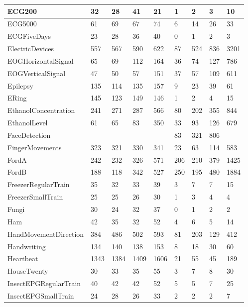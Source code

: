 \begin{landscape}
\begin{longtable}{|l|llll|llll|}
      ECG200 & 32 & 28 & 41 & 21 & 1 & 2 & 3 & 10 \\ \hline
      ECG5000 & 61 & 69 & 67 & 74 & 6 & 14 & 26 & 33 \\ \hline
      ECGFiveDays & 23 & 28 & 36 & 40 & 0 & 1 & 2 & 3 \\ \hline
      ElectricDevices & 557 & 567 & 590 & 622 & 87 & 524 & 836 & 3201 \\ \hline
      EOGHorizontalSignal & 65 & 69 & 112 & 164 & 36 & 74 & 127 & 786 \\ \hline
      EOGVerticalSignal & 47 & 50 & 57 & 151 & 37 & 57 & 109 & 611 \\ \hline
      Epilepsy & 135 & 114 & 135 & 157 & 9 & 23 & 39 & 61 \\ \hline
      ERing & 145 & 123 & 149 & 146 & 1 & 2 & 4 & 15 \\ \hline
      EthanolConcentration & 241 & 271 & 287 & 566 & 80 & 202 & 355 & 844 \\ \hline
      EthanolLevel & 61 & 65 & 83 & 350 & 33 & 93 & 126 & 679 \\ \hline
      FaceDetection &  &  &  &  & 83 & 321 & 806 &  \\ \hline
      FingerMovements & 323 & 321 & 330 & 341 & 23 & 63 & 114 & 583 \\ \hline
      FordA & 242 & 232 & 326 & 571 & 206 & 210 & 379 & 1425 \\ \hline
      FordB & 188 & 118 & 342 & 527 & 250 & 195 & 480 & 1884 \\ \hline
      FreezerRegularTrain & 35 & 32 & 33 & 39 & 3 & 7 & 7 & 15 \\ \hline
      FreezerSmallTrain & 25 & 25 & 26 & 30 & 1 & 3 & 4 & 4 \\ \hline
      Fungi & 30 & 24 & 32 & 37 & 0 & 1 & 2 & 2 \\ \hline
      Ham & 42 & 35 & 32 & 52 & 4 & 6 & 5 & 14 \\ \hline
      HandMovementDirection & 384 & 486 & 502 & 593 & 81 & 203 & 129 & 412 \\ \hline
      Handwriting & 134 & 140 & 138 & 153 & 8 & 18 & 30 & 60 \\ \hline
      Heartbeat & 1343 & 1384 & 1409 & 1606 & 21 & 55 & 45 & 189 \\ \hline
      HouseTwenty & 30 & 33 & 35 & 55 & 3 & 7 & 8 & 30 \\ \hline
      InsectEPGRegularTrain & 40 & 42 & 42 & 52 & 5 & 5 & 7 & 25 \\ \hline
      InsectEPGSmallTrain & 24 & 28 & 26 & 33 & 2 & 2 & 2 & 7 \\ \hline

\end{longtable}
\end{landscape}
